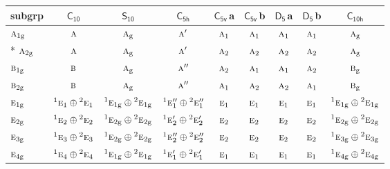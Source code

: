 \documentclass[10pt,a4paper]{article}
\numberwithin{equation}{section}
\newcommand{\grp}[1]{\mathsf{#1}}
\newcommand{\irr}[1]{\text{\normalfont\scshape #1}}
\newcommand{\conjpair}[1]{{}^{#1}}
\newcommand{\ptag}[1]{\mathrm{#1}}
\newcommand{\clsletter}[1]{\,{\scriptsize\color{black!55}#1}}
\begin{document}
{\small\begin{longtable}{@{}lcccccccc@{}}\toprule
subgrp & \href{C10.pdf}{$\grp{C_{10}}$} & \href{S10.pdf}{$\grp{S_{10}}$} & \href{C5h.pdf}{$\grp{C_{5h}}$} & \href{C5v.pdf}{$\grp{C_{5v}}$}\clsletter{a} & \href{C5v.pdf}{$\grp{C_{5v}}$}\clsletter{b} & \href{D5.pdf}{$\grp{D_{5}}$}\clsletter{a} & \href{D5.pdf}{$\grp{D_{5}}$}\clsletter{b} & \href{C10h.pdf}{$\grp{C_{10h}}$}\\\midrule\endhead
\bottomrule\endfoot\endlastfoot
$\irr{a}_{1\ptag{g}}$ & $\irr{a}$ & $\irr{a}_{\ptag{g}}$ & $\irr{a}'$ & $\irr{a}_{1}$ & $\irr{a}_{1}$ & $\irr{a}_{1}$ & $\irr{a}_{1}$ & $\irr{a}_{\ptag{g}}$\\*
$\irr{a}_{2\ptag{g}}$ & $\irr{a}$ & $\irr{a}_{\ptag{g}}$ & $\irr{a}'$ & $\irr{a}_{2}$ & $\irr{a}_{2}$ & $\irr{a}_{2}$ & $\irr{a}_{2}$ & $\irr{a}_{\ptag{g}}$\\
$\irr{b}_{1\ptag{g}}$ & $\irr{b}$ & $\irr{a}_{\ptag{g}}$ & $\irr{a}''$ & $\irr{a}_{2}$ & $\irr{a}_{1}$ & $\irr{a}_{1}$ & $\irr{a}_{2}$ & $\irr{b}_{\ptag{g}}$\\
$\irr{b}_{2\ptag{g}}$ & $\irr{b}$ & $\irr{a}_{\ptag{g}}$ & $\irr{a}''$ & $\irr{a}_{1}$ & $\irr{a}_{2}$ & $\irr{a}_{2}$ & $\irr{a}_{1}$ & $\irr{b}_{\ptag{g}}$\\
$\irr{e}_{1\ptag{g}}$ & $\conjpair{1}\irr{e}_{1}\oplus \conjpair{2}\irr{e}_{1}$ & $\conjpair{1}\irr{e}_{1\ptag{g}}\oplus \conjpair{2}\irr{e}_{1\ptag{g}}$ & $\conjpair{1}\irr{e}_{1}''\oplus \conjpair{2}\irr{e}_{1}''$ & $\irr{e}_{1}$ & $\irr{e}_{1}$ & $\irr{e}_{1}$ & $\irr{e}_{1}$ & $\conjpair{1}\irr{e}_{1\ptag{g}}\oplus \conjpair{2}\irr{e}_{1\ptag{g}}$\\
$\irr{e}_{2\ptag{g}}$ & $\conjpair{1}\irr{e}_{2}\oplus \conjpair{2}\irr{e}_{2}$ & $\conjpair{1}\irr{e}_{2\ptag{g}}\oplus \conjpair{2}\irr{e}_{2\ptag{g}}$ & $\conjpair{1}\irr{e}_{2}'\oplus \conjpair{2}\irr{e}_{2}'$ & $\irr{e}_{2}$ & $\irr{e}_{2}$ & $\irr{e}_{2}$ & $\irr{e}_{2}$ & $\conjpair{1}\irr{e}_{2\ptag{g}}\oplus \conjpair{2}\irr{e}_{2\ptag{g}}$\\
$\irr{e}_{3\ptag{g}}$ & $\conjpair{1}\irr{e}_{3}\oplus \conjpair{2}\irr{e}_{3}$ & $\conjpair{1}\irr{e}_{2\ptag{g}}\oplus \conjpair{2}\irr{e}_{2\ptag{g}}$ & $\conjpair{1}\irr{e}_{2}''\oplus \conjpair{2}\irr{e}_{2}''$ & $\irr{e}_{2}$ & $\irr{e}_{2}$ & $\irr{e}_{2}$ & $\irr{e}_{2}$ & $\conjpair{1}\irr{e}_{3\ptag{g}}\oplus \conjpair{2}\irr{e}_{3\ptag{g}}$\\
$\irr{e}_{4\ptag{g}}$ & $\conjpair{1}\irr{e}_{4}\oplus \conjpair{2}\irr{e}_{4}$ & $\conjpair{1}\irr{e}_{1\ptag{g}}\oplus \conjpair{2}\irr{e}_{1\ptag{g}}$ & $\conjpair{1}\irr{e}_{1}'\oplus \conjpair{2}\irr{e}_{1}'$ & $\irr{e}_{1}$ & $\irr{e}_{1}$ & $\irr{e}_{1}$ & $\irr{e}_{1}$ & $\conjpair{1}\irr{e}_{4\ptag{g}}\oplus \conjpair{2}\irr{e}_{4\ptag{g}}$\\

\end{longtable}}
\end{document}
